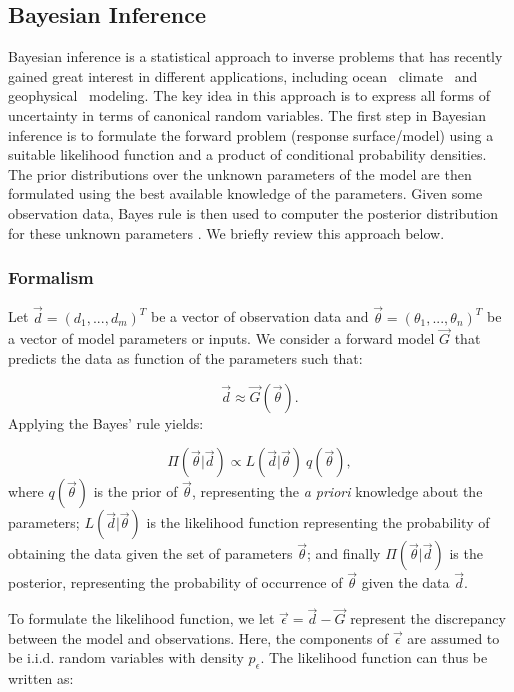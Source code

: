 \subsection{Bayesian Inference}
 \label{sec:inference}
 
Bayesian inference is a statistical approach to inverse problems
that has recently gained great interest in different applications, including
ocean~\citep{Alexagnderian2011a,Zedler2012,sraj:2013a}
climate~\citep{OlsonEtAl2012} and geophysical~\citep{Malinverno2002} modeling.
The key idea in this approach is to express all forms of uncertainty
in terms of canonical random variables. The first step in Bayesian inference 
is to formulate the forward problem (response surface/model) using 
a suitable likelihood function and a product of conditional probability densities. 
The prior distributions over the unknown parameters of the model
are then formulated using the best available knowledge of the parameters.  Given some observation data, Bayes rule 
is then used to computer the posterior distribution for these unknown parameters
\citep{sivia}. We briefly review this approach below.
\subsubsection{Formalism}

Let $\vec{d}=(d_1,...,d_m)^T$ be a vector of observation data and $\vec{\theta}=(\theta_1,...,\theta_n)^T$ be a vector of model parameters or inputs. We consider a forward model $\vec G$ that predicts the data as function of 
the parameters such that:

\begin{equation}
\vec d \approx \vec{G}( \vec \theta).
\end{equation}
Applying the Bayes' rule yields:

\begin{equation}
 \Pi(\vec{\theta}| \vec d) \propto 
 L(\vec d | \vec{\theta}) \ q(\vec{\theta}), 
\label{eq:bayes}
\end{equation}
where $q(\vec{\theta})$ is the prior of $\vec{\theta}$, representing the \emph{a priori} knowledge
about the parameters; 
$L(\vec d| \vec{\theta})$ is the likelihood function representing
the probability of obtaining the data given the set of parameters $\vec{\theta}$;
and finally $\Pi(\vec{\theta}| \vec d)$ is the posterior,
representing the probability of occurrence of $\vec{\theta}$ given the data $\vec d $.

To formulate the likelihood function, we let $\vec \epsilon = \vec d - \vec{G}$
represent the discrepancy between the model and observations.
Here, the components of $\vec \epsilon $ are assumed to be i.i.d. random variables with density $p_{\epsilon}$.
The likelihood function can thus be written as:

